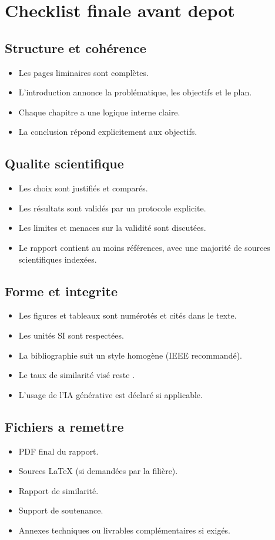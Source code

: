 \chapter{Checklist finale avant depot}

\section{Structure et coh\'erence}
\begin{itemize}[leftmargin=1.2cm]
\item \okitem{} Les pages liminaires sont compl\`etes.
\item \okitem{} L'introduction annonce la probl\'ematique, les objectifs et le plan.
\item \okitem{} Chaque chapitre a une logique interne claire.
\item \okitem{} La conclusion r\'epond explicitement aux objectifs.
\end{itemize}

\section{Qualite scientifique}
\begin{itemize}[leftmargin=1.2cm]
\item \okitem{} Les choix sont justifi\'es et compar\'es.
\item \okitem{} Les r\'esultats sont valid\'es par un protocole explicite.
\item \okitem{} Les limites et menaces sur la validit\'e sont discut\'ees.
\item \okitem{} Le rapport contient au moins \MinReferences{} r\'ef\'erences, avec une majorit\'e de sources scientifiques index\'ees.
\end{itemize}

\section{Forme et integrite}
\begin{itemize}[leftmargin=1.2cm]
\item \okitem{} Les figures et tableaux sont num\'erot\'es et cit\'es dans le texte.
\item \okitem{} Les unit\'es SI sont respect\'ees.
\item \okitem{} La bibliographie suit un style homog\`ene (IEEE recommand\'e).
\item \okitem{} Le taux de similarit\'e vis\'e reste \SimilarityTarget{}.
\item \okitem{} L'usage de l'IA g\'en\'erative est d\'eclar\'e si applicable.
\end{itemize}

\section{Fichiers a remettre}
\begin{itemize}[leftmargin=1.2cm]
\item PDF final du rapport.
\item Sources LaTeX (si demand\'ees par la fili\`ere).
\item Rapport de similarit\'e.
\item Support de soutenance.
\item Annexes techniques ou livrables compl\'ementaires si exig\'es.
\end{itemize}
